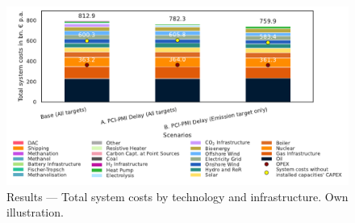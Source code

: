 \documentclass[10pt]{article}
\begin{document}
\begin{figure}[!htbp]
    \centering
    \includegraphics[width=1\textwidth]{system_costs}
    \caption{Results --- Total system costs by technology and infrastructure. Own illustration.}
    \label{fig:system_costs}
\end{figure}
\end{document}
